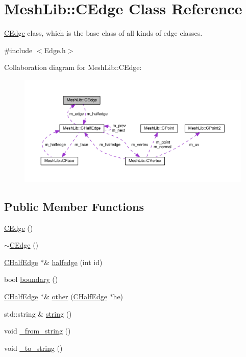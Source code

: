 \hypertarget{class_mesh_lib_1_1_c_edge}{}\section{Mesh\+Lib\+:\+:C\+Edge Class Reference}
\label{class_mesh_lib_1_1_c_edge}


\hyperlink{class_mesh_lib_1_1_c_edge}{C\+Edge} class, which is the base class of all kinds of edge classes.  




{\ttfamily \#include $<$Edge.\+h$>$}



Collaboration diagram for Mesh\+Lib\+:\+:C\+Edge\+:
\nopagebreak
\begin{figure}[H]
\begin{center}
\leavevmode
\includegraphics[width=350pt]{class_mesh_lib_1_1_c_edge__coll__graph}
\end{center}
\end{figure}
\subsection*{Public Member Functions}
\begin{DoxyCompactItemize}
\item 
\hyperlink{class_mesh_lib_1_1_c_edge_a513a0dc0e44f2592d516926c90763b67}{C\+Edge} ()
\item 
\hyperlink{class_mesh_lib_1_1_c_edge_a06f2cccf7d71658e397d83205f4a2c29}{$\sim$\+C\+Edge} ()
\item 
\hyperlink{class_mesh_lib_1_1_c_half_edge}{C\+Half\+Edge} $\ast$\& \hyperlink{class_mesh_lib_1_1_c_edge_a779a45a145714d9b177afb097ddfd5e6}{halfedge} (int id)
\item 
bool \hyperlink{class_mesh_lib_1_1_c_edge_a5fb31e9605d9f59fd89f74039bf4f9d9}{boundary} ()
\item 
\hyperlink{class_mesh_lib_1_1_c_half_edge}{C\+Half\+Edge} $\ast$\& \hyperlink{class_mesh_lib_1_1_c_edge_a5090261064156147ada856dea6e364f0}{other} (\hyperlink{class_mesh_lib_1_1_c_half_edge}{C\+Half\+Edge} $\ast$he)
\item 
std\+::string \& \hyperlink{class_mesh_lib_1_1_c_edge_a295387b2b8521e365312dbc2be90ec9a}{string} ()
\item 
void \hyperlink{class_mesh_lib_1_1_c_edge_a18e3af9e9a7dc8e6f60a2483bb19ad24}{\+\_\+from\+\_\+string} ()
\item 
void \hyperlink{class_mesh_lib_1_1_c_edge_a420d6973d64a53c21ef4dc15c557b36f}{\+\_\+to\+\_\+string} ()
\end{DoxyCompactItemize}
